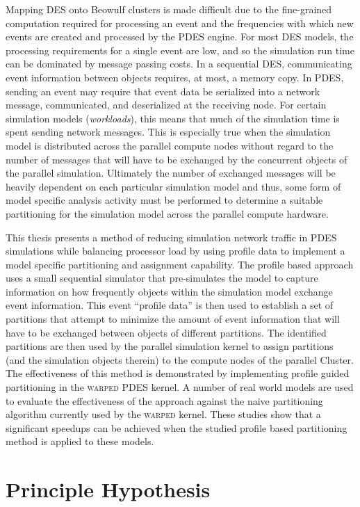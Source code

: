 \documentclass[11pt]{book}
\begin{document}
Mapping DES onto Beowulf clusters is made difficult due to the fine-grained computation required for processing an event and the frequencies with which new events are created and processed by the PDES engine. For most DES models, the processing requirements for a single event are low, and so the simulation run time can be dominated by message passing costs. In a sequential DES, communicating event information between objects requires, at most, a memory copy. In PDES, sending an event may require that event data be serialized into a network message, communicated, and deserialized at the receiving node. For certain simulation models (\emph{workloads}), this means that much of the simulation time is spent sending network messages. This is especially true when the simulation model is distributed across the parallel compute nodes without regard to the number of messages that will have to be exchanged by the concurrent objects of the parallel simulation. Ultimately the number of exchanged messages will be heavily dependent on each particular simulation model and thus, some form of model specific analysis activity must be performed to determine a suitable partitioning for the simulation model across the parallel compute hardware.

This thesis presents a method of reducing simulation network traffic in PDES simulations while balancing processor load by using profile data to implement a model specific partitioning and assignment capability. The profile based approach uses a small sequential simulator that pre-simulates the model to capture information on how frequently objects within the simulation model exchange event information. This event ``profile data'' is then used to establish a set of partitions that attempt to minimize the amount of event information that will have to be exchanged between objects of different partitions. The identified partitions are then used by the parallel simulation kernel to assign partitions (and the simulation objects therein) to the compute nodes of the parallel Cluster. The effectiveness of this method is demonstrated by implementing profile guided partitioning in the \textsc{warped} PDES kernel. A number of real world models are used to evaluate the effectiveness of the approach against the naive partitioning algorithm currently used by the \textsc{warped} kernel. These studies show that a significant speedups can be achieved when the studied profile based partitioning method is applied to these models.

\section{Principle Hypothesis}
\end{document}
